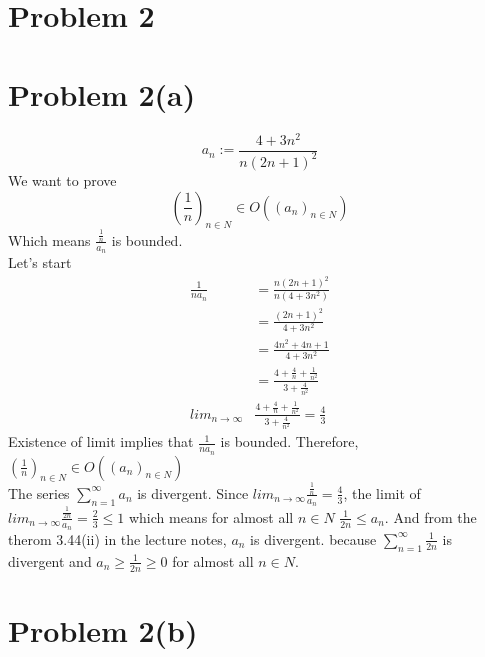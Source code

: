 \documentclass{article}
\begin{document}
\section*{Problem 2}
\section*{Problem 2(a)}
\[
   a_n := \frac{4 + 3n^2}{n(2n+1)^2}
\]
We want to prove
\[
   (\frac{1}{n})_{n \in N} \in O((a_n)_{n \in N})
\]
Which means \(\frac{\frac{1}{n}}{a_n}\) is bounded. \\
Let's start
\begin{align*}
   \frac{1}{na_n} &= \frac{n(2n+1)^2}{n(4 + 3n^2)} \\
                  &= \frac{(2n+1)^2}{4 + 3n^2} \\
                  &= \frac{4n^2 + 4n + 1}{4 + 3n^2} \\
                  &= \frac{4 + \frac{4}{n} + \frac{1}{n^2}}{3 + \frac{4}{n^2}} \\
   lim_{n \rightarrow \infty} & \frac{4 + \frac{4}{n} + \frac{1}{n^2}}{3 + \frac{4}{n^2}} = \frac{4}{3}
\end{align*}
Existence of limit implies that \(\frac{1}{na_n}\) is bounded. Therefore, \((\frac{1}{n})_{n \in N} \in O((a_n)_{n \in N})\) \\
The series \(\sum_{n=1}^{\infty} a_n\) is divergent. Since \(lim_{n \rightarrow \infty} \frac{\frac{1}{n}}{a_n} = \frac{4}{3}\), 
the limit of \(lim_{n \rightarrow \infty} \frac{\frac{1}{2n}}{a_n} = \frac{2}{3} \leq 1\) 
which means for almost all \(n \in N\) \(\frac{1}{2n} \leq a_n\). And from the therom 3.44(ii) in the lecture notes,
\(a_n\) is divergent. because \(\sum_{n=1}^{\infty}\frac{1}{2n}\) is divergent and \(a_n \geq \frac{1}{2n} \geq 0\) for almost all \(n \in N\).

\section*{Problem 2(b)}
\end{document}
